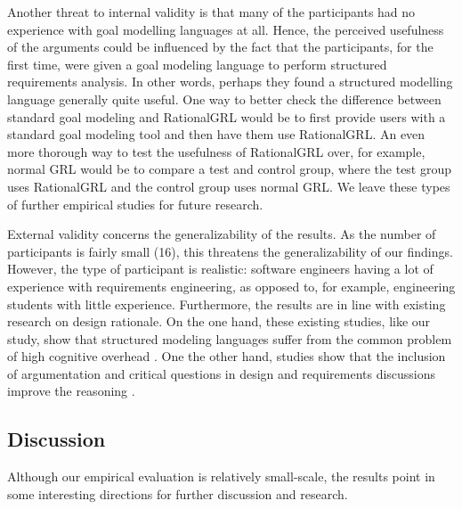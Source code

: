 Another threat to internal validity is that many of the participants had no experience with goal modelling languages at all. Hence, the perceived usefulness of the arguments could be influenced by the fact that the participants, for the first time, were given a goal modeling language to perform structured requirements analysis. In other words, perhaps they found a structured modelling language generally quite useful. One way to better check the difference between standard goal modeling and RationalGRL would be to first provide users with a standard goal modeling tool and then have them use RationalGRL. An even more thorough way to test the usefulness of RationalGRL over, for example, normal GRL would be to compare a test and control group, where the test group uses RationalGRL and the control group uses normal GRL. We leave these types of further empirical studies for future research.

External validity concerns the generalizability of the results. As the number of participants is fairly small (16), this threatens the generalizability of our findings. However, the type of participant is realistic: software engineers having a lot of experience with requirements engineering, as opposed to, for example, engineering students with little experience. Furthermore, the results are in line with existing research on design rationale. On the one hand, these existing studies, like our study, show that structured modeling languages suffer from the common problem of high cognitive overhead \cite{shum2006hypermedia}. One the other hand, studies show that the inclusion of argumentation and critical questions in design and requirements discussions improve the reasoning \cite{razavian2016two,TangEtal2018}.

\subsection{Discussion}
Although our empirical evaluation is relatively small-scale, the results point in some interesting directions for further discussion and research. 


